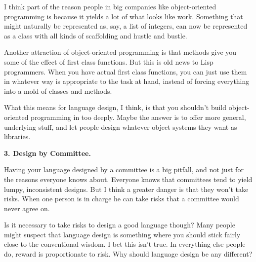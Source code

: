 I think part of the reason people in big companies like object-oriented
programming is because it yields a lot of what looks like work.
Something that might naturally be represented as, say, a list of
integers, can now be represented as a class with all kinds of
scaffolding and hustle and bustle.

Another attraction of object-oriented programming is that methods give
you some of the effect of first class functions. But this is old news to
Lisp programmers. When you have actual first class functions, you can
just use them in whatever way is appropriate to the task at hand,
instead of forcing everything into a mold of classes and methods.

What this means for language design, I think, is that you shouldn't
build object-oriented programming in too deeply. Maybe the answer is to
offer more general, underlying stuff, and let people design whatever
object systems they want as libraries.

\textbf{3. Design by Committee.}

Having your language designed by a committee is a big pitfall, and not
just for the reasons everyone knows about. Everyone knows that
committees tend to yield lumpy, inconsistent designs. But I think a
greater danger is that they won't take risks. When one person is in
charge he can take risks that a committee would never agree on.

Is it necessary to take risks to design a good language though? Many
people might suspect that language design is something where you should
stick fairly close to the conventional wisdom. I bet this isn't true. In
everything else people do, reward is proportionate to risk. Why should
language design be any different?
